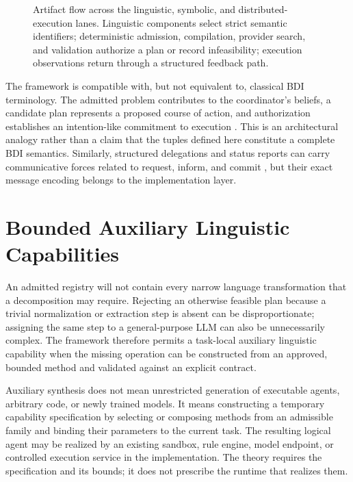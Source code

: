 \begin{figure}[htbp]
\centering

\caption{Artifact flow across the linguistic, symbolic, and distributed-execution lanes. Linguistic components select strict semantic identifiers; deterministic admission, compilation, provider search, and validation authorize a plan or record infeasibility; execution observations return through a structured feedback path.}
\label{fig:theoretical-bridge}
\end{figure}

The framework is compatible with, but not equivalent to, classical BDI terminology. The admitted problem contributes to the coordinator's beliefs, a candidate plan represents a proposed course of action, and authorization establishes an intention-like commitment to execution \cite{rao1991modeling,rao1995bdi}. This is an architectural analogy rather than a claim that the tuples defined here constitute a complete BDI semantics. Similarly, structured delegations and status reports can carry communicative forces related to request, inform, and commit \cite{austin1962how,searle1969speech,cohen1990intention,fipa2002acl}, but their exact message encoding belongs to the implementation layer.

\section{Bounded Auxiliary Linguistic Capabilities}

An admitted registry will not contain every narrow language transformation that a decomposition may require. Rejecting an otherwise feasible plan because a trivial normalization or extraction step is absent can be disproportionate; assigning the same step to a general-purpose LLM can also be unnecessarily complex. The framework therefore permits a task-local auxiliary linguistic capability when the missing operation can be constructed from an approved, bounded method and validated against an explicit contract.

Auxiliary synthesis does not mean unrestricted generation of executable agents, arbitrary code, or newly trained models. It means constructing a temporary capability specification by selecting or composing methods from an admissible family and binding their parameters to the current task. The resulting logical agent may be realized by an existing sandbox, rule engine, model endpoint, or controlled execution service in the implementation. The theory requires the specification and its bounds; it does not prescribe the runtime that realizes them.


